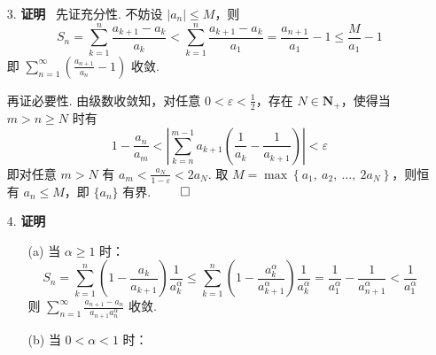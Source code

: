 \documentclass[11pt,oneside,fontset=fandol]{ctexbook} %
\begin{document}
\begin{enumerate}
    \item[3.]
    \textbf{证明} \ 先证充分性. 不妨设 $|a_n| \leqslant M$，则
    \[
        S_n = \sum_{k=1}^n \frac{a_{k+1} - a_k}{a_k} < \sum_{k=1}^n \frac{a_{k+1} - a_k}{a_1} = \frac{a_{n+1}}{a_1} - 1 \leqslant \frac M {a_1} - 1
    \]
    即 $\sum_{n=1}^{\infty} \left( \frac{a_{n+1}}{a_n} - 1 \right)$ 收敛.

    再证必要性. 由级数收敛知，对任意 $0 < \varepsilon < \frac 1 2$，存在 $N \in \mathbf N_+$，使得当 $m > n \geqslant N$ 时有
    \[
        1 - \frac{a_n}{a_{m}} < \left| \sum_{k=n}^{m-1} a_{k+1} \left( \frac 1 {a_k} - \frac 1 {a_{k+1}} \right) \right| < \varepsilon
    \]
    即对任意 $m > N$ 有 $a_m < \frac{a_N}{1 - \varepsilon} < 2a_N$. 取 $M = \max\left\{ a_1,\ a_2,\ \ldots,\ 2a_N \right\}$，则恒有 $a_n \leqslant M$，即 $\{ a_n \}$ 有界.
    $\hfill\qed$
    \item[4.]
    \textbf{证明}
    \begin{enumerate}
        \item[(a)]
        当 $\alpha \geqslant 1$ 时：
        \[
            S_n = \sum_{k=1}^n \left( 1 - \frac{a_k}{a_{k+1}} \right) \frac 1 {a_k^{\alpha}} \leqslant \sum_{k=1}^n \left( 1 - \frac{a_k^{\alpha}}{a_{k+1}^{\alpha}} \right) \frac 1 {a_k^{\alpha}} = \frac 1 {a_1^{\alpha}} - \frac 1 {a_{n+1}^{\alpha}} < \frac 1 {a_1^{\alpha}}
        \]
        则 $\sum_{n=1}^{\infty} \frac{a_{n+1} - a_n}{a_{n+1} a_n^{\alpha}}$ 收敛.
        \item[(b)]
        当 $0 < \alpha < 1$ 时：


\end{enumerate}
\end{enumerate}
\end{document}
